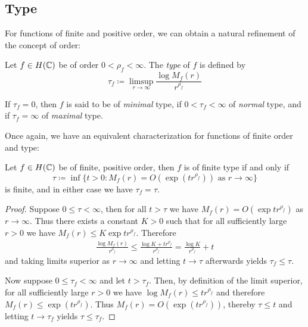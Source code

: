 \subsection{Type}

For functions of finite and positive order, we can obtain a natural refinement of the concept of order:

\begin{definition}
    Let $f \in H(\mathbb{C})$ be of order $0 < \rho_f < \infty$. The \emph{type} of $f$ is defined by
    \begin{equation} \label{eq:def-type}
        \tau_f \coloneqq \limsup_{r \to \infty} \frac{\log M_f(r)}{r^{\rho_f}}
    \end{equation}

    If $\tau_f = 0$, then $f$ is said to be of \emph{minimal} type, if $0 < \tau_f < \infty$ of \emph{normal} type, and if $\tau_f = \infty$ of \emph{maximal} type.
\end{definition}

Once again, we have an equivalent characterization for functions of finite order and type:

\begin{proposition} \label{prop:type-infimum}
    Let $f \in H(\mathbb{C})$ be of finite, positive order, then $f$ is of finite type if and only if
    \begin{equation}
        \tau \coloneqq \inf \{ t > 0 : M_f(r) = O(\exp (t r^{\rho_f})) \textrm{ as } r \to \infty \}
    \end{equation}
    is finite, and in either case we have $\tau_f = \tau$.
\end{proposition}

\begin{proof}
    Suppose $0 \leq \tau < \infty$, then for all $t > \tau$ we have $M_f(r) = O(\exp t r^{\rho_f})$ as $r \to \infty$. Thus there exists a constant $K > 0$ such that for all sufficiently large $r > 0$ we have $M_f(r) \leq K \exp t r^{\rho_f}$. Therefore
    \begin{align*}
        \frac{\log M_f(r)}{r^{\rho_f}} \leq \frac{\log K + t r^{\rho_f}}{r^{\rho_f}} = \frac{\log K}{r^{\rho_f}} + t
    \end{align*}
    and taking limits superior as $r \to \infty$ and letting $t \to \tau$ afterwards yields $\tau_f \leq \tau$.

    Now suppose $0 \leq \tau_f < \infty$ and let $t > \tau_f$. Then, by definition of the limit superior, for all sufficiently large $r > 0$ we have $ \log M_f(r) \leq t r^{\rho_f}$ and therefore $M_f(r) \leq \exp(t r^{\rho_f})$. Thus $M_f(r) = O(\exp (t r^{\rho_f}))$, thereby $\tau \leq t$ and letting $t \to \tau_f$ yields $\tau \leq \tau_f$.
\end{proof}

